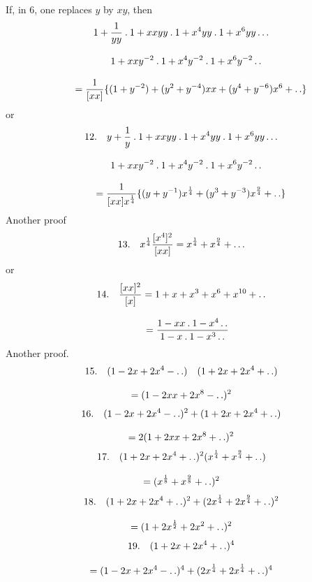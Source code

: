 If, in 6, one replaces $y$ by $xy$, then
\[
\begin{gathered}
1+\frac{1}{yy}\mathbin{.}1+xxyy\mathbin{.}1+x^4yy\mathbin{.}1+x^6yy\mathinner{.\,.\,.}
\\[8pt]\quad{}1+xxy^{-2}\mathbin{.}1+x^4y^{-2}\mathbin{.}1+x^6y^{-2}\mathinner{.\,.}\\[8pt]
\qquad=\frac{1}{[xx]}\{(1+y^{-2})+(y^2+y^{-4})xx+(y^4+y^{-6})x^6+\mathinner{.\,.}\}
\end{gathered}
\]
or
\[
\begin{gathered}
12.\quad{}y+\frac{1}{y}\mathbin{.}1+xxyy\mathbin{.}1+x^4yy\mathbin{.}1+x^6yy\mathinner{.\,.\,.}
\\[8pt]\quad{}1+xxy^{-2}\mathbin{.}1+x^4y^{-2}\mathbin{.}1+x^6y^{-2}\mathinner{.\,.}\\[8pt]
\qquad=\frac{1}{[xx]x^{\frac14}}\{(y+y^{-1})x^{\frac14}+(y^3+y^{-3})x^{\frac94}+\mathinner{.\,.}\}
\end{gathered}
\]
Another proof
\[
13.\quad x^{\frac14}\frac{[x^4]^2}{[xx]}=x^{\frac14}+x^{\frac94}+\mathinner{.\,.\,.}
\]
or
\[
\begin{gathered}14.\quad\frac{[xx]^2}{[x]}=1+x+x^3+x^6+x^{10}+\mathinner{.\,.}
\\[8pt]\quad{}=\frac{1-xx\mathbin{.}1-x^4\mathinner{.\,.}}{1-x\mathbin{.}1-x^3\mathinner{.\,.}}\end{gathered}
\]
Another proof.
\[
\begin{gathered}15.\quad(1-2x+2x^4-\mathinner{.\,.})\quad(1+2x+2x^4+\mathinner{.\,.})
\\[8pt]=(1-2xx+2x^8-\mathinner{.\,.})^2\end{gathered}
\]
\[
\begin{gathered}16.\quad(1-2x+2x^4-\mathinner{.\,.})^2+(1+2x+2x^4+\mathinner{.\,.})
\\[8pt]=2(1+2xx+2x^8+\mathinner{.\,.})^2\end{gathered}
\]
\[
\begin{gathered}17.\quad(1+2x+2x^4+\mathinner{.\,.})^2(x^{\frac14}+x^{\frac94}+\mathinner{.\,.})
\\[8pt]=(x^{\frac18}+x^{\frac98}+\mathinner{.\,.})^2\end{gathered}
\]
\[
\begin{gathered}18.\quad(1+2x+2x^4+\mathinner{.\,.})^2+(2x^{\frac14}+2x^{\frac94}+\mathinner{.\,.})^2
\\[8pt]=(1+2x^{\frac12}+2x^2+\mathinner{.\,.})^2\end{gathered}
\]
\[
\begin{gathered}19.\quad(1+2x+2x^4+\mathinner{.\,.})^4
\\[8pt]=(1-2x+2x^4-\mathinner{.\,.})^4+(2x^{\frac14}+2x^{\frac14}+\mathinner{.\,.})^4\end{gathered}
\]
\clearpage
\endgroup
